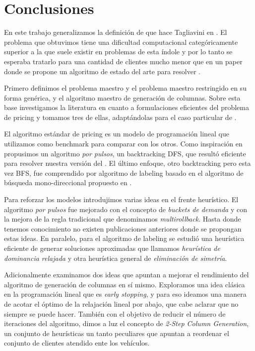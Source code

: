 \chapter{Conclusiones}

En este trabajo generalizamos la definición de  que hace Tagliavini en \cite{tagliavini}. El problema que obtuvimos tiene una dificultad computacional categóricamente superior a la que suele existir en problemas de esta índole y por lo tanto se esperaba tratarlo para una cantidad de clientes mucho menor que en un paper donde se propone un algoritmo de estado del arte para resolver . 

Primero definimos el problema maestro y el problema maestro restringido en su forma genérica, y el algoritmo maestro de generación de columnas. Sobre esta base investigamos la literatura en cuanto a formulaciones eficientes del problema de pricing y tomamos tres de ellas, adaptándolas para el caso particular de .

El algoritmo estándar de pricing es un modelo de programación lineal que utilizamos como benchmark para comparar con los otros. Como inspiración en \cite{lozano-duque-medaglia} propusimos un algoritmo \emph{por pulsos}, un backtracking DFS, que resultó eficiente para resolver nuestra versión del . El último enfoque, otro backtracking pero esta vez BFS, fue comprendido por algoritmo de labeling basado en el algoritmo de búsqueda mono-direccional propuesto en \cite{righini-salani}. 

Para reforzar los modelos introdujimos varias ideas en el frente heurístico. El algoritmo \emph{por pulsos} fue mejorado con el concepto de \emph{buckets de demanda} y con la mejora de la regla tradicional que denominamos \emph{multirollback}. Hasta donde tenemos conocimiento no existen publicaciones anteriores donde se propongan estas ideas. En paralelo, para el algoritmo de labeling se estudió una heurística eficiente de generar soluciones aproximadas que llamamos \emph{heurística de dominancia relajada} y otra heurística general de \emph{eliminación de simetría}.

Adicionalmente examinamos dos ideas que apuntan a mejorar el rendimiento del algoritmo de generación de columnas en sí mismo. Exploramos una idea clásica en la programación lineal que es \emph{early stopping}, y para eso ideamos una manera de acotar el óptimo de la relajación lineal por abajo, que cabe aclarar que no siempre se puede hacer. También con el objetivo de reducir el número de iteraciones del algoritmo, dimos a luz el concepto de \emph{2-Step Column Generation}, un conjunto de heurísticas un tanto peculiares que apuntan a reordenar el conjunto de clientes atendido ente los vehículos.


